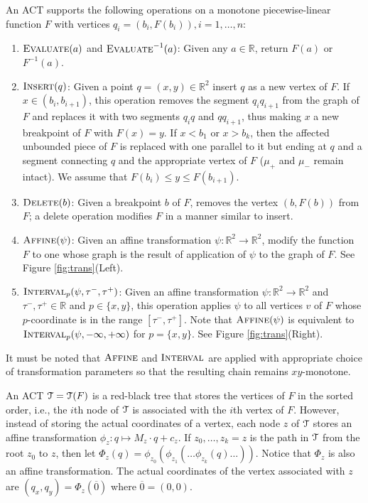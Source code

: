 \documentclass[11pt]{article}
\def\tvec{c}
\def\amat{M}
\def\qq{q}
\def\zz{{\text{\boldmath $z$}}}
\def\TT{\EuScript{T}}
\def\reals{\mathbb{R}}
\def\zz{z}
\def\eval{\mathop{\mbox{\textsc{Evaluate}}}}
\def\evali{\mathop{\mbox{\textsc{Evaluate}}}^{-1}}
\def\ins{\mathop{\mbox{\textsc{Insert}}}}
\def\delete{\mathop{\mbox{\textsc{Delete}}}}
\def\atrans{\mathop{\textsc{Affine}}}
\def\itrans{\mathop{\textsc{Interval}}}
\begin{document}
An ACT supports the following operations on a monotone piecewise-linear
function $F$ with vertices $\qq_i = (b_i, F(b_i)), i = 1, \dots, n$:
\begin{enumerate}
\item $\eval(a)$ and $\evali(a)$: Given any $a \in \mathbb{R}$, return 
$F(a)$ or $F^{-1}(a)$.

\item $\ins(\qq)$: Given a point $\qq = (x, y) \in \mathbb{R}^2$ insert 
$\qq$ as a new vertex of $F$. If $x \in (b_i, b_{i+1})$,
this operation removes the segment $\qq_i\qq_{i+1}$ from the graph of 
$F$ and replaces it with two segments $\qq_i\qq$ and $\qq\qq_{i+1}$, 
thus making $x$ a new breakpoint of $F$ with $F(x) = y$. 
If $x < b_1$ or $x > b_k$, then the affected unbounded piece of $F$ is 
replaced with one parallel to it but ending at $q$ and 
a segment connecting $q$ and the appropriate vertex of $F$ 
($\mu_+$ and $\mu_-$ remain intact).  We assume that 
$F(b_i) \le y \le F(b_{i+1})$.

\item $\delete(b)$: Given a breakpoint $b$ of $F$, removes the vertex 
$(b, F(b))$ from $F$; a delete operation modifies $F$ in a 
manner similar to insert.

\item $\atrans(\psi)$: Given an affine transformation 
$\psi:\mathbb{R}^2 \rightarrow \mathbb{R}^2$, modify the 
function $F$ to one whose graph is the result of application of 
$\psi$ to the graph of $F$. See Figure \ref{fig:trans}(Left).

\item $\itrans_p(\psi, \tau^-, \tau^+)$: Given an affine transformation
$\psi:\reals^2\rightarrow \reals^2$ and $\tau^-, \tau^+ \in \reals$ 
and $p \in \{x, y\}$, this operation applies $\psi$ to all vertices 
$v$ of $F$ whose $p$-coordinate is in the range $[\tau^-, \tau^+]$. Note that $\atrans(\psi)$ is equivalent to $\itrans_p(\psi, -\infty, +\infty)$ for $p = \{x,y\}$. See Figure \ref{fig:trans}(Right).



\end{enumerate} 

It must be noted that $\atrans$ and $\itrans$ are applied 
with appropriate choice of transformation parameters so that the 
resulting chain remains $xy$-monotone.  

An ACT $\TT = \TT(F)$ is a red-black tree that stores the vertices
of $F$ in the sorted order, i.e., the $i$th node of $\TT$ is
associated with the $i$th vertex of $F$. However, instead of storing
the actual coordinates of a vertex, each node $\zz$ of $\TT$ stores
an affine transformation 
$\phi_z: \qq \mapsto \amat_\zz \cdot \qq + \tvec_\zz$. 
If $\zz_0, \dots, \zz_k = \zz$ is the path in $\TT$ from the root
$\zz_0$ to $\zz$, then let $
\Phi_\zz(\qq) = \phi_{\zz_0}(\phi_{\zz_1}(\dots \phi_{\zz_k}(\qq)\dots)).
$
Notice that $\Phi_\zz$ is also an affine transformation. 
The actual coordinates of the vertex associated with $\zz$ are $(q_x, q_y) = \Phi_\zz(\overline{0})$ where $\overline{0} = (0, 0)$.
\end{document}
